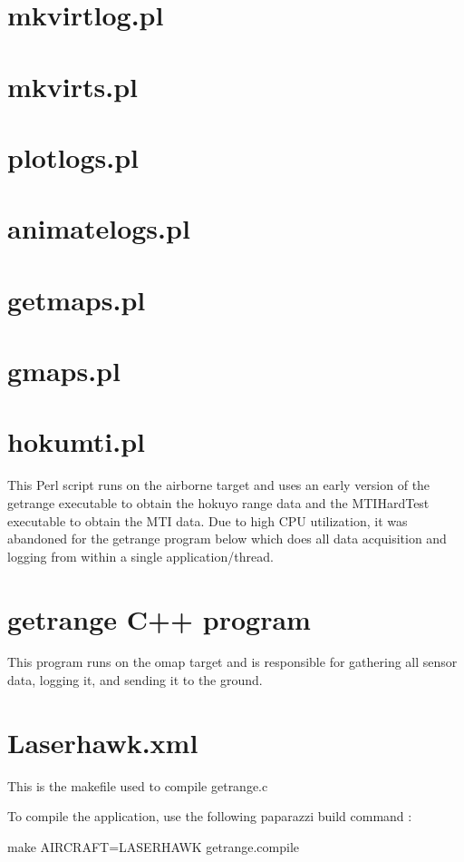 \documentclass[a4paper,11pt]{report}
\begin{document}
\lstset{caption=}

\section{mkvirtlog.pl}

\section{mkvirts.pl}

\section{plotlogs.pl}

\section{animatelogs.pl}

\section{getmaps.pl}

\section{gmaps.pl}

\section{hokumti.pl}
This Perl script runs on the airborne target and uses an early version of the getrange executable to obtain the hokuyo range data and the MTIHardTest executable to obtain the MTI data. Due to high CPU utilization, it was abandoned for the getrange program below which does all data acquisition and logging from within a single application/thread.


\lstset{language=C++}
\section{getrange C++ program}
This program runs on the omap target and is responsible for gathering all sensor data, logging it, and sending it to the ground.


\lstset{language=make}
\section{Laserhawk.xml}
This is the makefile used to compile getrange.c

To compile the application, use the following paparazzi build command : 

make AIRCRAFT=LASERHAWK getrange.compile


\end{document}
